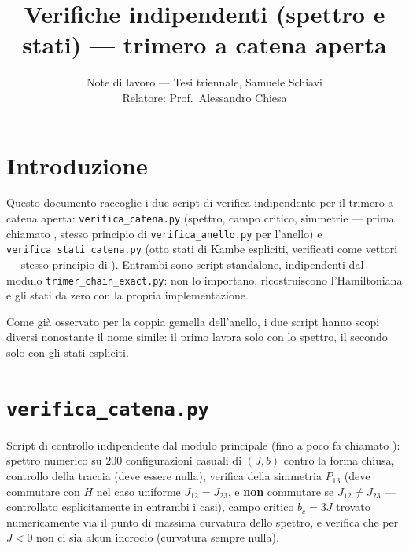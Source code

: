 \documentclass[11pt,a4paper]{article}
\title{Verifiche indipendenti (spettro e stati) — trimero a catena aperta}
\author{Note di lavoro — Tesi triennale, Samuele Schiavi\\ Relatore: Prof.\ Alessandro Chiesa}
\date{}
\begin{document}
\maketitle

\section*{Introduzione}

Questo documento raccoglie i due script di verifica indipendente per il trimero a
catena aperta: \texttt{verifica\_catena.py} (spettro, campo critico, simmetrie —
prima chiamato \texttt{}, stesso principio di
\texttt{verifica\_anello.py} per l'anello) e \texttt{verifica\_stati\_catena.py} (otto
stati di Kambe espliciti, verificati come vettori — stesso principio di
\texttt{}). Entrambi sono script standalone, indipendenti
dal modulo \texttt{trimer\_chain\_exact.py}: non lo importano, ricostruiscono
l'Hamiltoniana e gli stati da zero con la propria implementazione.

Come già osservato per la coppia gemella dell'anello, i due script hanno scopi
diversi nonostante il nome simile: il primo lavora solo con lo spettro, il secondo
solo con gli stati espliciti.

\section*{\texttt{verifica\_catena.py}}

Script di controllo indipendente dal modulo principale (fino a poco fa chiamato
\texttt{}): spettro numerico su 200 configurazioni
casuali di $(J,b)$ contro la forma chiusa, controllo della traccia (deve essere
nulla), verifica della simmetria $P_{13}$ (deve commutare con $H$ nel caso uniforme
$J_{12}=J_{23}$, e \textbf{non} commutare se $J_{12}\neq J_{23}$ — controllato
esplicitamente in entrambi i casi), campo critico $b_c=3J$ trovato numericamente via
il punto di massima curvatura dello spettro, e verifica che per $J<0$ non ci sia
alcun incrocio (curvatura sempre nulla).
\end{document}
